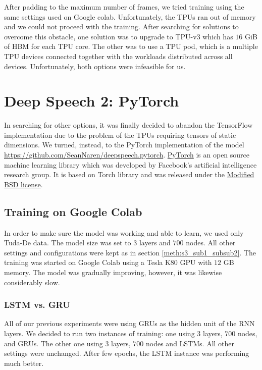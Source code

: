 After padding to the maximum number of frames, we tried training using the same settings used on Google colab. Unfortunately, the \ac{TPU}s ran out of memory and we could not proceed with the training. After searching for solutions to overcome this obstacle, one solution was to upgrade to TPU-v3 which has $16$ GiB of \ac{HBM} for each \ac{TPU} core. The other was to use a \ac{TPU} pod, which is a multiple \ac{TPU} devices connected together with the workloads distributed across all devices. Unfortunately, both options were infeasible for us.

\section{Deep Speech 2: PyTorch}
\label{meth:s4}

In searching for other options, it was finally decided to abandon the TensorFlow implementation due to the problem of the \ac{TPU}s requiring tensors of static dimensions. We turned, instead, to the PyTorch implementation of the model \url{https://github.com/SeanNaren/deepspeech.pytorch}. 
\href{https://pytorch.org/}{PyTorch} is an open source machine learning library which was developed by 
Facebook's artificial intelligence research group. It is based on Torch library and was released under the \href{https://en.wikipedia.org/wiki/BSD_licenses#3-clause}{Modified BSD license}.

\subsection{Training on Google Colab}
\label{meth:s4_sub1}

In order to make sure the model was working and able to learn, we used only Tuda-De data. The model size was set to $3$ layers and $700$ nodes. All other settings and configurations were kept as in section \ref{meth:s3_sub1_subsub2}. The training was started on Google Colab using a Tesla K80 GPU with $12$ GB memory. The model was gradually improving, however, it was likewise considerably slow.

\subsubsection{LSTM vs. GRU}
\label{meth:s4_sub1_subsub1}

All of our previous experiments were using \ac{GRU}s as the hidden unit of the \ac{RNN} layers. We decided to run two instances of training: one using $3$ layers, $700$ nodes, and \ac{GRU}s. The other one using $3$ layers, $700$ nodes and \ac{LSTM}s. All other settings were unchanged.
After few epochs, the \ac{LSTM} instance was performing much better.

